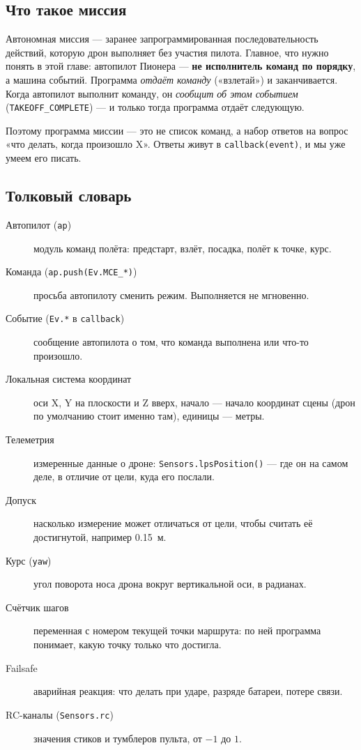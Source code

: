 \subsection{Что такое миссия}

Автономная миссия --- заранее запрограммированная последовательность действий, которую дрон выполняет без участия пилота. Главное, что нужно понять в этой главе: автопилот Пионера --- \textbf{не исполнитель команд по порядку}, а машина событий. Программа \emph{отдаёт команду} («взлетай») и заканчивается. Когда автопилот выполнит команду, он \emph{сообщит об этом событием} (\verb|TAKEOFF_COMPLETE|) --- и только тогда программа отдаёт следующую.

Поэтому программа миссии --- это не список команд, а набор ответов на вопрос «что делать, когда произошло X». Ответы живут в \verb|callback(event)|, и мы уже умеем его писать.

\subsection{Толковый словарь}
\begin{description}
  \item[Автопилот (\texttt{ap})] модуль команд полёта: предстарт, взлёт, посадка, полёт к точке, курс.
  \item[Команда (\texttt{ap.push(Ev.MCE\_*)})] просьба автопилоту сменить режим. Выполняется не мгновенно.
  \item[Событие (\texttt{Ev.*} в \texttt{callback})] сообщение автопилота о том, что команда выполнена или что-то произошло.
  \item[Локальная система координат] оси X, Y на плоскости и Z вверх, начало --- начало координат сцены (дрон по умолчанию стоит именно там), единицы --- метры.
  \item[Телеметрия] измеренные данные о дроне: \texttt{Sensors.lpsPosition()} --- где он на самом деле, в отличие от цели, куда его послали.
  \item[Допуск] насколько измерение может отличаться от цели, чтобы считать её достигнутой, например 0.15~м.
  \item[Курс (\texttt{yaw})] угол поворота носа дрона вокруг вертикальной оси, в радианах.
  \item[Счётчик шагов] переменная с номером текущей точки маршрута: по ней программа понимает, какую точку только что достигла.
  \item[Failsafe] аварийная реакция: что делать при ударе, разряде батареи, потере связи.
  \item[RC-каналы (\texttt{Sensors.rc})] значения стиков и тумблеров пульта, от $-1$ до $1$.
\end{description}
